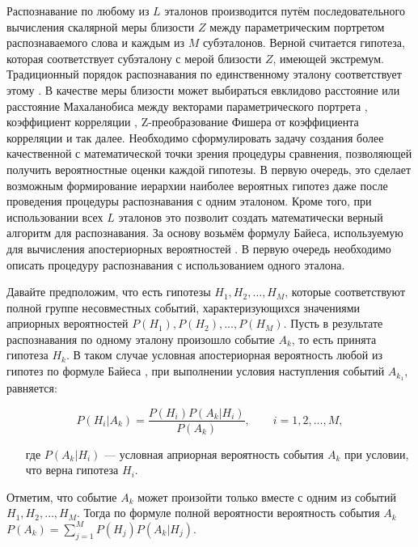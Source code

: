 Распознавание по любому из $L$ эталонов производится путём последовательного вычисления скалярной меры близости $Z$ между параметрическим портретом распознаваемого слова и каждым из $M$ субэталонов.
Верной считается гипотеза, которая соответствует субэталону с мерой близости $Z$, имеющей экстремум.
Традиционный порядок распознавания по единственному эталону соответствует этому \cite{rabiner1993fundamentals}.
В качестве меры близости может выбираться евклидово расстояние или расстояние Махаланобиса между векторами параметрического портрета \cite{rabiner1993fundamentals}, коэффициент корреляции \cite{korsun2016automatic}, Z-преобразование Фишера от коэффициента корреляции \cite{korsun2017recognition} и так далее.
Необходимо сформулировать задачу создания более качественной с математической точки зрения процедуры сравнения, позволяющей получить вероятностные оценки каждой гипотезы.
В первую очередь, это сделает возможным формирование иерархии наиболее вероятных гипотез даже после проведения процедуры распознавания с одним эталоном.
Кроме того, при использовании всех $L$ эталонов это позволит создать математически верный алгоритм для распознавания.
За основу возьмём формулу Байеса, используемую для вычисления апостериорных вероятностей \cite{ventcel1999theory}.
В первую очередь необходимо описать процедуру распознавания с использованием одного эталона.

Давайте предположим, что есть гипотезы $H_1, H_2, \dots, H_M$, которые соответствуют полной группе несовместных событий, характеризующихся значениями априорных вероятностей $P(H_1), P(H_2), \dots, P(H_M)$.
Пусть в результате распознавания по одному эталону произошло событие $A_k$, то есть принята гипотеза $H_k$.
В таком случае условная апостериорная вероятность любой из гипотез по формуле Байеса \cite{ventcel1999theory}, при выполнении условия наступления событий $A_{k_1}$, равняется:

\begin{equation}\label{eq:2_5_1_1}
P(H_i|A_k) = \frac{P(H_i) P(A_k|H_i)}{P(A_k)},
\qquad
i = 1, 2, \dots, M,
\end{equation}
\begin{itemize}[align=left,leftmargin=1.8em,itemindent=0pt,labelsep=0pt,labelwidth=1.8em]
	\item[где] $P(A_k|H_i)$ --- условная априорная вероятность события $A_k$ при условии, что верна гипотеза $H_i$.
\end{itemize}

Отметим, что событие $A_k$ может произойти только вместе с одним из событий $H_1, H_2, \dots, H_M$.
Тогда по формуле полной вероятности \cite{ventcel1999theory} вероятность события $A_k$ $P(A_k) = \sum_{j=1}^M P(H_j) P(A_k|H_j)$.

